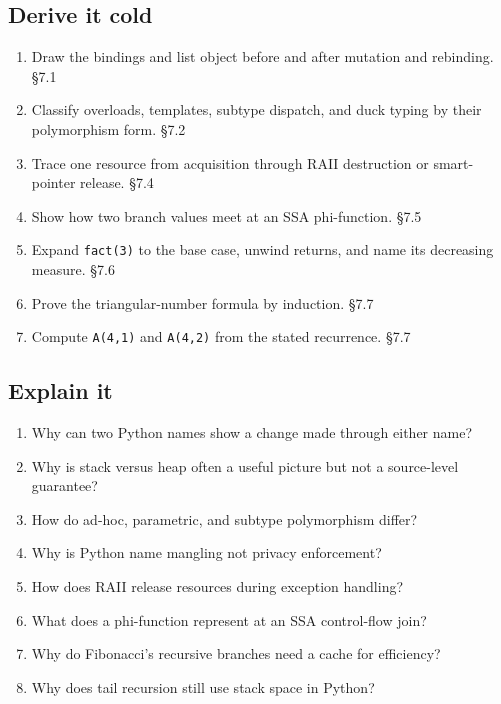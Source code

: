 \documentclass[11pt]{article}
\begin{document}
\begin{keepsection}
\section{Derive it cold}

\begin{enumerate}
\item Draw the bindings and list object before and after mutation and rebinding. \hfill{\small\color{FAUblue}§7.1}
\item Classify overloads, templates, subtype dispatch, and duck typing by their polymorphism form. \hfill{\small\color{FAUblue}§7.2}
\item Trace one resource from acquisition through RAII destruction or smart-pointer release. \hfill{\small\color{FAUblue}§7.4}
\item Show how two branch values meet at an SSA phi-function. \hfill{\small\color{FAUblue}§7.5}
\item Expand \texttt{fact(3)} to the base case, unwind returns, and name its decreasing measure. \hfill{\small\color{FAUblue}§7.6}
\item Prove the triangular-number formula by induction. \hfill{\small\color{FAUblue}§7.7}
\item Compute \texttt{A(4,1)} and \texttt{A(4,2)} from the stated recurrence. \hfill{\small\color{FAUblue}§7.7}
\end{enumerate}
\end{keepsection}

\begin{keepsection}
\section{Explain it}

\begin{enumerate}
\item Why can two Python names show a change made through either name?
\item Why is stack versus heap often a useful picture but not a source-level guarantee?
\item How do ad-hoc, parametric, and subtype polymorphism differ?
\item Why is Python name mangling not privacy enforcement?
\item How does RAII release resources during exception handling?
\item What does a phi-function represent at an SSA control-flow join?
\item Why do Fibonacci’s recursive branches need a cache for efficiency?
\item Why does tail recursion still use stack space in Python?
\end{enumerate}

\end{keepsection}
\end{document}
